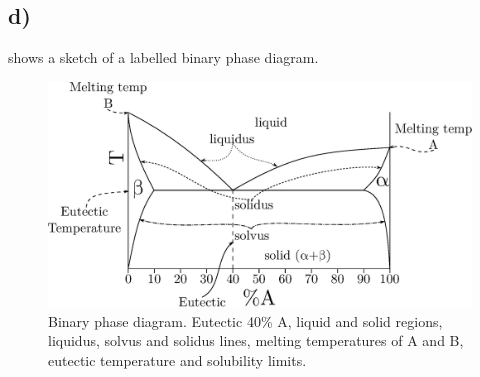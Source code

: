 \documentclass[a4paper]{article}
\begin{document}
	\subsection{d)}\label{ss:pdab}
	 shows a sketch of a labelled binary phase diagram.
	\begin{figure}
		\centering
		\includegraphics[width=\linewidth]{pdab.eps}
		\caption{Binary phase diagram. Eutectic 40\% A, liquid and solid regions, liquidus, solvus and solidus lines, melting temperatures of A and B, eutectic temperature and solubility limits.}
		\label{f:pdab}
	\end{figure}
\end{document}
